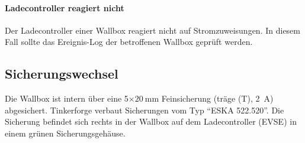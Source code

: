 \documentclass[a4paper,10pt]{article}
\begin{document}
\begin{multicols*}{2}
    \paragraph{Ladecontroller reagiert nicht}
    Der Ladecontroller einer Wallbox reagiert nicht auf Stromzuweisungen. In diesem Fall sollte das Ereignis-Log der betroffenen Wallbox geprüft werden.

    \subsection{Sicherungswechsel}
    Die Wallbox ist intern über eine 5$\times\SI{20}{\milli\meter}$
	Feinsicherung (träge (T), \SI{2}{\ampere}) abgesichert.
    Tinkerforge verbaut Sicherungen vom Typ \enquote{ESKA 522.520}.
	Die Sicherung befindet sich rechts in der Wallbox auf dem Ladecontroller
	(EVSE) in einem grünen Sicherungsgehäuse.

    \vfill
    \null

\end{multicols*}
\end{document}
